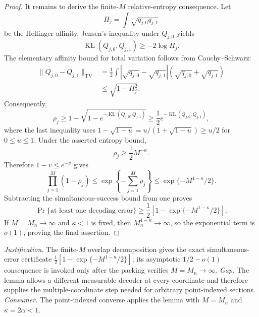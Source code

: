 \documentclass{article}
\begin{document}
\begin{proof}
It remains to derive the finite-\(M\) relative-entropy consequence.  Let
\[
 H_j=\int\sqrt{q_{j,0}q_{j,1}}
\]
be the Hellinger affinity.  Jensen's inequality under \(Q_{j,0}\) yields
\[
 \operatorname{KL}(Q_{j,0},Q_{j,1})\geq-2\log H_j.
\]
The elementary affinity bound for total variation follows from Cauchy--Schwarz:
\[
\begin{aligned}
 \lVert Q_{j,0}-Q_{j,1}\rVert_{\mathrm{TV}}
 &=\frac12\int|\sqrt{q_{j,0}}-\sqrt{q_{j,1}}|
             (\sqrt{q_{j,0}}+\sqrt{q_{j,1}})\\
 &\leq\sqrt{1-H_j^2}.
\end{aligned}
\]
Consequently,
\[
 \rho_j
 \geq1-\sqrt{1-e^{-\operatorname{KL}(Q_{j,0},Q_{j,1})}}
 \geq\frac12e^{-\operatorname{KL}(Q_{j,0},Q_{j,1})},
\]
where the last inequality uses \(1-\sqrt{1-u}=u/(1+\sqrt{1-u})\geq u/2\) for \(0\leq u\leq1\).  Under the asserted entropy bound,
\[
 \rho_j\geq\frac12M^{-\kappa}.
\]
Therefore \(1-v\leq e^{-v}\) gives
\[
 \prod_{j=1}^M(1-\rho_j)
 \leq\exp\!\left\{-\sum_{j=1}^M\rho_j\right\}
 \leq\exp\{-M^{1-\kappa}/2\}.
\]
Subtracting the simultaneous-success bound from one proves
\[
 \Pr\{\text{at least one decoding error}\}
 \geq\frac12\left[1-\exp\{-M^{1-\kappa}/2\}\right].
\]
If \(M=M_n\to\infty\) and \(\kappa<1\) is fixed, then \(M_n^{1-\kappa}\to\infty\), so the exponential term is \(o(1)\), proving the final assertion.
\end{proof}
\par\smallskip\noindent \textit{Justification.} The finite-\(M\) overlap decomposition gives the exact simultaneous-error certificate \(\frac12[1-\exp\{-M^{1-\kappa}/2\}]\); its asymptotic \(1/2-o(1)\) consequence is invoked only after the packing verifies \(M=M_n\to\infty\). \textit{Gap.} The lemma allows a different measurable decoder at every coordinate and therefore supplies the multiple-coordinate step needed for arbitrary point-indexed sections. \textit{Consumer.} The point-indexed converse applies the lemma with \(M=M_n\) and \(\kappa=2\alpha<1\).
\end{document}
